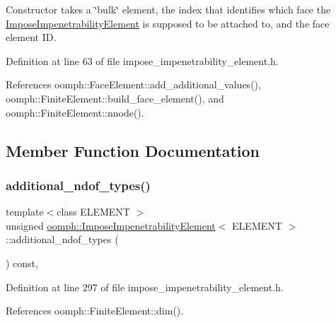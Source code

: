Constructor takes a \char`\"{}bulk\char`\"{} element, the index that identifies which face the \hyperlink{classoomph_1_1ImposeImpenetrabilityElement}{Impose\+Impenetrability\+Element} is supposed to be attached to, and the face element ID. 



Definition at line 63 of file impose\+\_\+impenetrability\+\_\+element.\+h.



References oomph\+::\+Face\+Element\+::add\+\_\+additional\+\_\+values(), oomph\+::\+Finite\+Element\+::build\+\_\+face\+\_\+element(), and oomph\+::\+Finite\+Element\+::nnode().



\subsection{Member Function Documentation}
\mbox{\label{classoomph_1_1ImposeImpenetrabilityElement_a9bd9f83e67108ac008efa20601fb1ade}} 
\subsubsection{\texorpdfstring{additional\+\_\+ndof\+\_\+types()}{additional\_ndof\_types()}}
{\footnotesize\ttfamily template$<$class E\+L\+E\+M\+E\+NT $>$ \\
unsigned \hyperlink{classoomph_1_1ImposeImpenetrabilityElement}{oomph\+::\+Impose\+Impenetrability\+Element}$<$ E\+L\+E\+M\+E\+NT $>$\+::additional\+\_\+ndof\+\_\+types (\begin{DoxyParamCaption}{ }\end{DoxyParamCaption}) const\hspace{0.3cm}{\ttfamily [inline]}, {\ttfamily [protected]}}



Definition at line 297 of file impose\+\_\+impenetrability\+\_\+element.\+h.



References oomph\+::\+Finite\+Element\+::dim().



